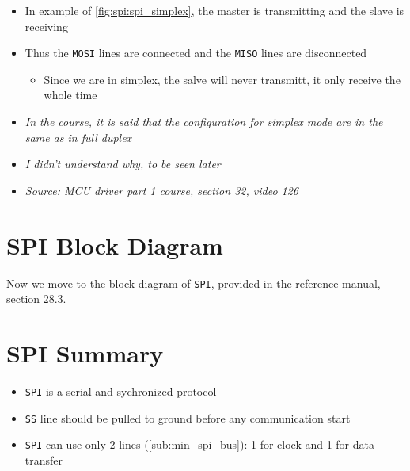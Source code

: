 \begin{itemize}

\item In example of \autoref{fig:spi:spi_simplex}, the master is transmitting and the slave is receiving

\item Thus the \verb|MOSI| lines are connected and the \verb|MISO| lines are disconnected 

	\begin{itemize}
	\item Since we are in simplex, the salve will never transmitt, it only receive the whole time
	\end{itemize}


\end{itemize}

 

\begin{itemize}

\item \textit{In the course, it is said that the configuration for simplex mode are in the same as in full duplex}

\item \textit{I didn't understand why, to be seen later}

\item \textit{Source: MCU driver part 1 course, section 32, video 126}

\end{itemize}

\newpage
\section{SPI Block Diagram}

Now we move to the block diagram of \verb|SPI|, provided in the reference manual, section 28.3.

\newpage
\section{SPI Summary}

\begin{itemize}

\item \verb|SPI| is a serial and sychronized protocol

\item \verb|SS| line should be pulled to ground before any communication start

\item \verb|SPI| can use only 2 lines (\ref{sub:min_spi_bus}): 1 for clock and 1 for data transfer


\end{itemize}




